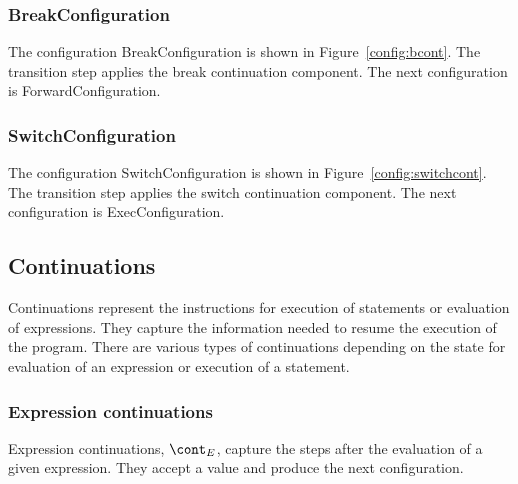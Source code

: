 \documentclass[a4paper,oneside]{article}
\begin{document}
\subsubsection{BreakConfiguration}
\label{subsubsec:breakconfig}

The configuration BreakConfiguration is shown in Figure~\ref{config:bcont}.
The transition step applies the break continuation component.
The next configuration is ForwardConfiguration.


\subsubsection{SwitchConfiguration}
\label{subsubsec:switchconfig}

The configuration SwitchConfiguration is shown in Figure~\ref{config:switchcont}.
The transition step applies the switch continuation component.
The next configuration is ExecConfiguration.


\subsection{Continuations}
\label{subsec:continuations-definition}

\newcommand{\expressionmeta}{\ensuremath{\mathit{E}}}
\newcommand{\expressionsmeta}{\expressionmeta{s}}
\newcommand{\variablemeta}{\ensuremath{\mathit{X}}}
\newcommand{\boolmeta}{\ensuremath{\mathit{B}}}
\newcommand{\integermeta}{\ensuremath{\mathit{I}}}
\newcommand{\doublemeta}{\ensuremath{\mathit{D}}}
\newcommand{\stringmeta}{\ensuremath{\mathit{S}}}
\newcommand{\idmeta}{\ensuremath{\mathit{X}}}
\newcommand{\membermeta}{\ensuremath{\mathit{M}}}
\newcommand{\typemeta}{\ensuremath{\mathit{T}}}
\newcommand{\statementmeta}{\ensuremath{\mathit{\stmt}}}
\newcommand{\labelmeta}{\ensuremath{\mathit{\tt{L}}}}

Continuations represent the instructions for execution of statements or evaluation of expressions.
They capture the information needed to resume the execution of the program.
There are various types of continuations depending on the state for evaluation of an expression or execution of a statement.


\subsubsection{Expression continuations}
\label{subsubsec:expression-continuations}

Expression continuations, $\econt$, capture the steps after the evaluation of a given expression.
They accept a value and produce the next configuration.
\end{document}
